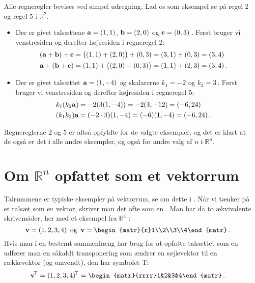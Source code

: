 \begin{bevis}
Alle regneregler bevises ved simpel udregning. Lad os som eksempel se på regel 2 og regel 5 i $\mathbb R ^2$.
\begin{itemize}
\item
Der er givet talsættene $\mathbf{a}=(1,1)$, $\mathbf{b}=(2,0)$ og $\mathbf{c}=(0,3)\,$. Først bruger vi venstresiden og derefter højresiden i regneregel 2:
\begin{align*}
(\mathbf{a} + \mathbf{b}) + \mathbf{c}&=\big((1,1)+(2,0)\big)+(0,3)=(3,1)+(0,3)=(3,4)\\
\mathbf{a} + (\mathbf{b} + \mathbf{c})&=(1,1)+\big((2,0)+(0,3)\big)=(1,1)+(2,3)=(3,4)\,.
\end{align*}
\item
Der er givet talsættet $\mathbf{a}=(1,-4)$ og skalarerne $k_1 = -2$ og $k_2 = 3\,$. Først bruger vi venstresiden og derefter højresiden i regneregel 5:
\begin{align*}
k_1(k_2\mathbf{a})&= -2(3(1,-4))=-2(3,-12)=(-6,24)\\
(k_1k_2)\mathbf{a}&=(-2\cdot 3)(1,-4)=(-6)(1,-4)=(-6,24)\,.
\end{align*}
\end{itemize}
Regnereglerne 2 og 5 er altså opfyldte for de valgte eksempler, og det er klart at de også er det i alle andre eksempler, og også for andre valg af $n$ i $\mathbb R ^n$.
\end{bevis}

\section{Om $\mathbb R^n $ opfattet som et vektorrum}
Talrummene er typiske eksempler på vektorrum, se om dette i . Når vi tænker på et talsæt som en vektor, skriver man det ofte som en . Man har da to ækvivalente skrivemåder, her med et eksempel fra $\mathbb R^4$ :
$$\mv=(1,2,3,4)\,\,\,\mathrm{og}\,\,\,
\mv=\begin{matr}{r}1\\2\\3\\4\end{matr}\,.$$
Hvis man i en bestemt sammenhæng har brug for at opfatte talsættet som en  udfører man en såkaldt transponering som ændrer en søjlevektor til en rækkevektor (og omvendt), den har symbolet T:
$$\mv\transp =(1,2,3,4)\transp=
\begin{matr}{rrrr}1&2&3&4\end{matr}\,.$$







 